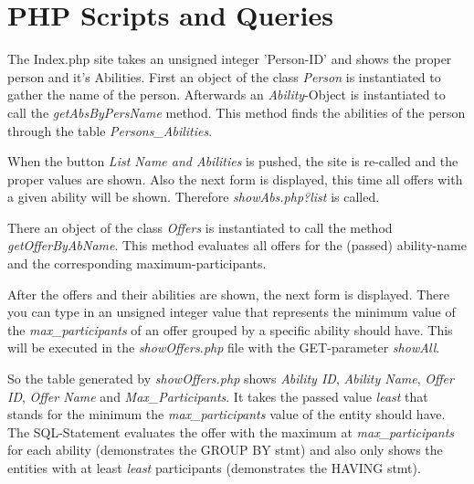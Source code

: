 \documentclass[12pt,a4paper,english]{article}
\begin{document}
\lstset{language=HTML}


\section{PHP Scripts and Queries} \label{sec:php}
The Index.php site takes an unsigned integer 'Person-ID' and shows the proper person and it's Abilities. First an object 
of the class \textit{Person} is instantiated to gather the name of the person. Afterwards an \textit{Ability}-Object is instantiated to 
call the \textit{getAbsByPersName} method. This method finds the abilities of the person through the table \emph{Persons\_Abilities}.




When the button \textit{List Name and Abilities} is pushed, the site is re-called and the proper values are shown. Also the next 
form is displayed, this time all offers with a given ability will be shown. Therefore \textit{showAbs.php?list} is called. 

There an object of the class \textit{Offers} is instantiated to call the method \textit{getOfferByAbName}. This method evaluates all 
offers for the (passed) ability-name and the corresponding maximum-participants.




After the offers and their abilities are shown, the next form is displayed. There you can type in an unsigned integer value 
that represents the minimum value of the \textit{max\_participants} of an offer grouped by a specific ability should have.
This will be executed in the \textit{showOffers.php} file with the GET-parameter \textit{showAll}. 


So the table generated by \textit{showOffers.php} shows \textit{Ability ID}, \textit{Ability Name}, \textit{Offer ID}, 
\textit{Offer Name} and \textit{Max\_Participants}. 
It takes the passed value \textit{least} that stands for the minimum the \textit{max\_participants} value of the entity should have. 
The SQL-Statement evaluates the offer with the maximum at \textit{max\_participants} for each ability (demonstrates the GROUP BY stmt) and 
also only shows the entities with at least \textit{least} participants (demonstrates the HAVING stmt).
\end{document}
